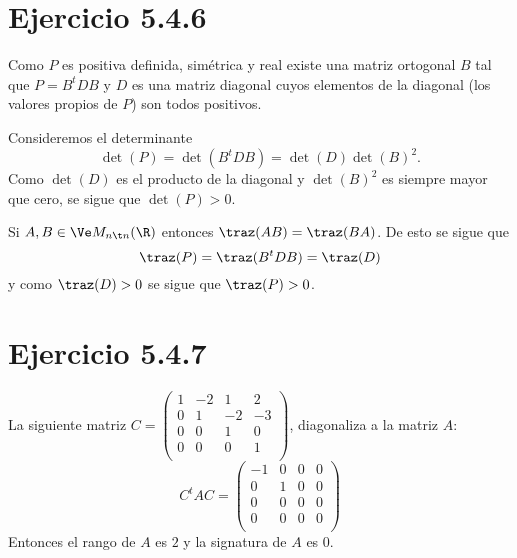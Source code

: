 \section*{Ejercicio 5.4.6}
\begin{sol}
	Como $P$ es positiva definida, simétrica y real existe una matriz ortogonal $B$ tal que $P=B^tDB$ y $D$ es una matriz diagonal cuyos elementos de la diagonal (los valores propios de $P$) son todos positivos.
	
	Consideremos el determinante
	\[ \det(P) = \det(B^tDB) = \det(D)\det(B)^2. \]
	Como $\det(D)$ es el producto de la diagonal y $\det(B)^2$ es siempre mayor que cero, se sigue que $\det(P)>0$.
	
	Si $A,B\in\Ve M_{n\t n}(\R)$ entonces $\traz(AB) = \traz(BA)$. De esto se sigue que
	\[ \traz(P) = \traz(B^tDB) = \traz(D) \]
	y como $\traz(D)>0$ se sigue que $\traz(P)>0$.
\end{sol}
\section*{Ejercicio 5.4.7}
\begin{sol}
	La siguiente matriz $C=\left( \begin{smallmatrix}
	1& -2 & 1 & 2 \\
	0& 1& -2& -3 \\
	0& 0& 1& 0\\
	0& 0& 0& 1\\
	\end{smallmatrix} \right)$,
	diagonaliza a la matriz $A$:
	\[ C^tAC = \begin{pmatrix}
	-1 & 0 & 0 & 0 \\
	0 & 1 & 0 & 0 \\
	0 & 0& 0& 0 \\ 
	0 & 0& 0& 0 \\
	\end{pmatrix} \]
	Entonces el rango de $A$ es $2$ y la signatura de $A$ es $0$.
\end{sol}
